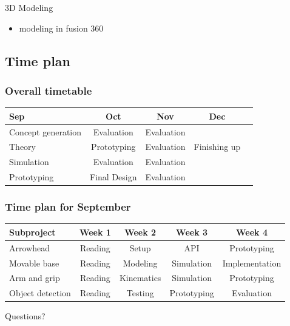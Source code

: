 \documentclass{beamer}
\begin{document}


\begin{frame}{3D Modeling}

    \begin{itemize}
        \item modeling in fusion 360
    \end{itemize}
\end{frame}










\begin{frame}
    \subsection{Time plan}
    \frametitle{Overall timetable}
    \begin{table}
        \begin{tabular}{| l | c | c | c | c }
            
            Sep & Oct & Nov & Dec \\
            \hline \hline
            Concept generation & Evaluation & Evaluation &  \\ 
            \hline
            Theory & Prototyping & Evaluation & Finishing up \\
            \hline
            Simulation & Evaluation & Evaluation & \\
            \hline
            Prototyping & Final Design & Evaluation &  \\
            \hline
 
        \end{tabular}
    \end{table}    
\end{frame}


\begin{frame}
    \frametitle{Time plan for September}
    \begin{table}
        \begin{tabular}{l | c | c | c | c }
        Subproject & Week 1 & Week 2 & Week 3 & Week 4 \\
        \hline \hline
            Arrowhead & Reading& Setup & API & Prototyping\\
            Movable base & Reading& Modeling & Simulation & Implementation\\
            Arm and grip  & Reading & Kinematics & Simulation& Prototyping\\
            Object detection & Reading & Testing & Prototyping & Evaluation\\
        \end{tabular}
    \end{table}
\end{frame}


\begin{frame}
    \begin{center}
        \Huge Questions?
    \end{center}
\end{frame}
\end{document}
